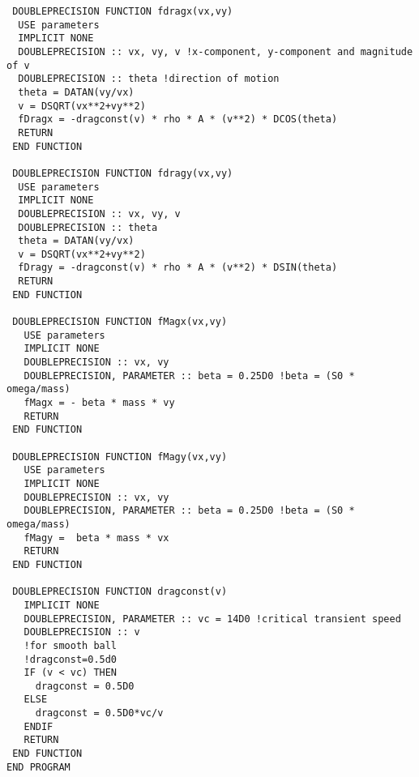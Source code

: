 \documentclass{article}
\begin{document}
\begin{verbatim}
 DOUBLEPRECISION FUNCTION fdragx(vx,vy)
  USE parameters
  IMPLICIT NONE
  DOUBLEPRECISION :: vx, vy, v !x-component, y-component and magnitude of v
  DOUBLEPRECISION :: theta !direction of motion
  theta = DATAN(vy/vx)
  v = DSQRT(vx**2+vy**2)
  fDragx = -dragconst(v) * rho * A * (v**2) * DCOS(theta)
  RETURN
 END FUNCTION
 
 DOUBLEPRECISION FUNCTION fdragy(vx,vy)
  USE parameters
  IMPLICIT NONE
  DOUBLEPRECISION :: vx, vy, v 
  DOUBLEPRECISION :: theta 
  theta = DATAN(vy/vx)
  v = DSQRT(vx**2+vy**2)
  fDragy = -dragconst(v) * rho * A * (v**2) * DSIN(theta)
  RETURN
 END FUNCTION

 DOUBLEPRECISION FUNCTION fMagx(vx,vy)
   USE parameters
   IMPLICIT NONE
   DOUBLEPRECISION :: vx, vy
   DOUBLEPRECISION, PARAMETER :: beta = 0.25D0 !beta = (S0 * omega/mass)
   fMagx = - beta * mass * vy
   RETURN
 END FUNCTION

 DOUBLEPRECISION FUNCTION fMagy(vx,vy)
   USE parameters
   IMPLICIT NONE
   DOUBLEPRECISION :: vx, vy
   DOUBLEPRECISION, PARAMETER :: beta = 0.25D0 !beta = (S0 * omega/mass)
   fMagy =  beta * mass * vx
   RETURN
 END FUNCTION
  
 DOUBLEPRECISION FUNCTION dragconst(v)
   IMPLICIT NONE
   DOUBLEPRECISION, PARAMETER :: vc = 14D0 !critical transient speed
   DOUBLEPRECISION :: v
   !for smooth ball
   !dragconst=0.5d0
   IF (v < vc) THEN
     dragconst = 0.5D0
   ELSE
     dragconst = 0.5D0*vc/v
   ENDIF 
   RETURN
 END FUNCTION
END PROGRAM
 \end{verbatim}
\end{document}
